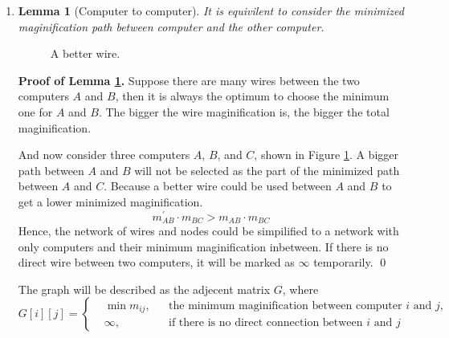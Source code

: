 \documentclass[12pt,a4paper]{article}
\makeatletter
\newtheorem{lemma}[theorem]{Lemma}
\newtheorem*{solution}{Solution}
\theoremstyle{definition}
\renewenvironment{solution}[1][Solution] {\par\pushQED{\qed}\normalfont\topsep6\p@\@plus6\p@\relax\trivlist\item[\hskip\labelsep\bfseries#1\@addpunct{.}]\ignorespaces}{\popQED\endtrivlist\@endpefalse} \makeatother
\makeatother
\begin{document}
\begin{enumerate}
\begin{solution}
		\begin{lemma}[Computer to computer]\label{lem:c2c}
			It is equivilent to consider the minimized maginification path between computer and the other computer.
		\end{lemma}
		\begin{figure}
			\centering
			
			\caption{A better wire.}
			\label{fig:bw}
		\end{figure}

		\textbf{Proof of Lemma \ref{lem:c2c}.} Suppose there are many wires between the two computers $A$ and $B$, then it is always the optimum to choose the minimum one for $A$ and $B$. The bigger the wire maginification is, the bigger the total maginification. 

		And now consider three computers $A$, $B$, and $C$, shown in Figure \ref{fig:bw}. A bigger path between $A$ and $B$ will not be selected as the part of the minimized path between $A$ and $C$. Because a better wire could be used between $A$ and $B$ to get a lower minimized maginification.
		\begin{equation*}
			m_{AB}^\prime \cdot m_{BC} > m_{AB} \cdot m_{BC} 
		\end{equation*}
		Hence, the network of wires and nodes could be simpilified to a network with only computers and their minimum maginification inbetween. If there is no direct wire between two computers, it will be marked as $\infty$ temporarily.
		\hfil \qed \vspace{\parskip}

		The graph will be described as the adjecent matrix $G$, where
		\begin{equation*}
			G[i][j] = \left\{\begin{aligned}
				&\min{m_{ij}}, && \text{the minimum maginification between computer }i\text{ and }j,\\
				&\infty, && \text{if there is no direct connection between }i\text{ and }j 
			\end{aligned}\right.
		\end{equation*}


\end{solution}
\end{enumerate}
\end{document}
